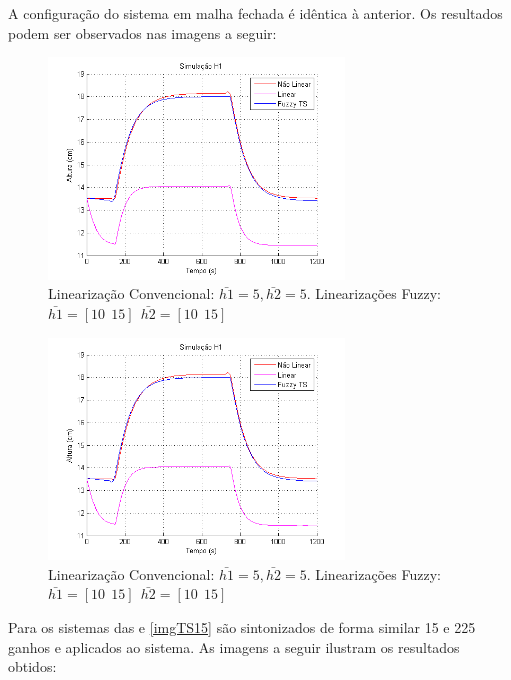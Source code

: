 A configuração do sistema em malha fechada é idêntica à anterior. Os resultados podem ser observados nas imagens a seguir:
\begin{figure}[H]
	\centering
	\includegraphics[width=0.7\textwidth]{img/FM_h1_5_10_15.png}
	\caption{\small Linearização Convencional: $ \bar{h1}=5, \bar{h2}=5$. Linearizações Fuzzy: $\bar{h1}=[10 \ \ 15] \ \ \bar{h2}=[10 \ \ 15]$ }
	\label{figH1TSCtrl2}
\end{figure}

\begin{figure}[H]
	\centering
	\includegraphics[width=0.7\textwidth]{img/FM_h1_5_10_15.png}
	\caption{\small Linearização Convencional: $ \bar{h1}=5, \bar{h2}=5$. Linearizações Fuzzy: $\bar{h1}=[10 \ \ 15] \ \ \bar{h2}=[10 \ \ 15]$ }
	\label{figH2CtrlTS2}
\end{figure}

Para os sistemas das  e \ref{imgTS15} são sintonizados de forma similar 15 e 225 ganhos e aplicados ao sistema. As imagens a seguir ilustram os resultados obtidos:

